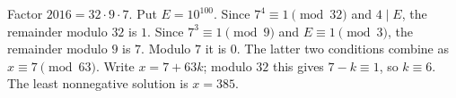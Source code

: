Factor $2016=32\cdot9\cdot7$. Put $E=10^{100}$. Since $7^4\equiv1\pmod{32}$ and $4\mid E$, the remainder modulo $32$ is $1$. Since $7^3\equiv1\pmod9$ and $E\equiv1\pmod3$, the remainder modulo $9$ is $7$. Modulo $7$ it is $0$. The latter two conditions combine as $x\equiv7\pmod{63}$. Write $x=7+63k$; modulo $32$ this gives $7-k\equiv1$, so $k\equiv6$. The least nonnegative solution is $\boxed{x=385}$.
